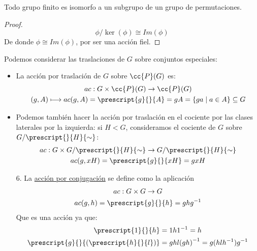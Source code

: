\begin{teo}[Cayley]
    Todo grupo finito es isomorfo a un subgrupo de un grupo de permutaciones.
    \begin{proof}
        \begin{equation*}
            \phi/\ker(\phi) \cong Im(\phi)
        \end{equation*}
        De donde $\phi \cong Im(\phi)$, por ser una acción fiel.
    \end{proof}
\end{teo}

\begin{ejemplo}
    Podemos considerar las traslaciones de $G$ sobre conjuntos especiales:
    \begin{itemize}
        \item La acción por traslación de $G$ sobre $\cc{P}(G)$ es:
            \begin{gather*}
                ac:G\times\cc{P}(G) \to \cc{P}(G) \\
                (g,A) \longmapsto ac(g,A) = \prescript{g}{}{A} = gA = \{ga \mid a\in A\} \subseteq G
            \end{gather*}
        \item Podemos también hacer la acción por traslación en el cociente por las clases laterales por la izquierda: si $H<G$, consideramos el cociente de $G$ sobre $G/\prescript{}{H}{\sim}$:
            \begin{gather*}
                ac:G\times G/\prescript{}{H}{\sim} \to G/\prescript{}{H}{\sim} \\
                ac(g,xH) = \prescript{g}{}{xH} = gxH
            \end{gather*}
    \end{itemize}
    \begin{enumerate}
        \item[6.] La \underline{acción por conjugación} se define como la aplicación
            \begin{gather*}
                ac:G\times G\to G \\
                ac(g,h) = \prescript{g}{}{h} = ghg^{-1}
            \end{gather*}
            Que es una acción ya que:
            \begin{align*}
                \prescript{1}{}{h} &= 1h1^{-1} = h \\
                \prescript{g}{}{(\prescript{h}{}{l})} &= ghl{(gh)}^{-1} = g(hlh^{-1})g^{-1}
            \end{align*}

\end{enumerate}
\end{ejemplo}
